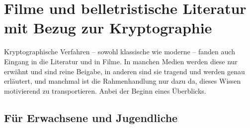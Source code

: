 %



\hypertarget{appendix-movies}{}
\section{Filme und belletristische Literatur mit Bezug zur Kryptographie}
\label{s:appendix-movies}


Kryptographische Verfahren -- sowohl klassische wie moderne -- fanden auch
Eingang in die Literatur und in Filme. In manchen Medien werden diese nur
erwähnt und sind reine Beigabe, in anderen sind sie tragend und werden
genau erläutert, und manchmal ist die Rahmenhandlung nur dazu da, dieses
Wissen motivierend zu transportieren. Anbei der Beginn eines Überblicks.

\subsection{Für Erwachsene und Jugendliche}
\label{s:Light-fiction-for-grownups}



